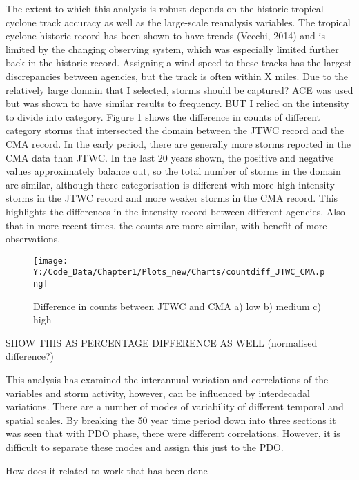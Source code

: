 The extent to which this analysis is robust depends on the historic tropical cyclone track accuracy as well as the large-scale reanalysis variables. The tropical cyclone historic record has been shown to have trends (Vecchi, 2014) and is limited by the changing observing system, which was especially limited further back in the historic record. Assigning a wind speed to these tracks has the largest discrepancies between agencies, but the track is often within X miles. Due to the relatively large domain that I selected, storms should be captured? ACE was used but was shown to have similar results to frequency. BUT I relied on the intensity to divide into category.
Figure \ref{fig:count_diff} shows the difference in counts of different category storms that intersected the domain between the JTWC record and the CMA record. In the early period, there are generally more storms reported in the CMA data than JTWC. In the last 20 years shown, the positive and negative values approximately balance out, so the total number of storms in the domain are similar, although there categorisation is different with more high intensity storms in the JTWC record and more weaker storms in the CMA record. This highlights the differences in the intensity record between different agencies. Also that in more recent times, the counts are more similar, with benefit of more observations.

\begin{figure}[h]
	\centering
	\noindent\texttt{[image: Y:/Code\_Data/Chapter1/Plots\_new/Charts/countdiff\_JTWC\_CMA.png]}	
	\caption{Difference in counts between JTWC and CMA a) low b) medium c) high}\label{fig:count_diff}
\end{figure}

SHOW THIS AS PERCENTAGE DIFFERENCE AS WELL (normalised difference?)


This analysis has examined the interannual variation and correlations of the variables and storm activity, however, can be influenced by interdecadal variations. There are a number of modes of variability of different temporal and spatial scales. By breaking the 50 year time period down into three sections it was seen that with PDO phase, there were different correlations. However, it is difficult to separate these modes and assign this just to the PDO.

How does it related to work that has been done
